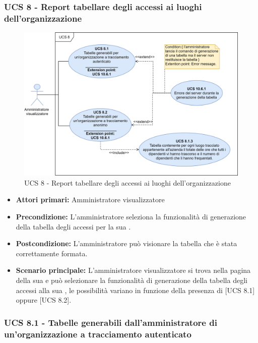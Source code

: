 \newpage
\subsubsection{UCS 8 - Report tabellare degli accessi ai luoghi dell'organizzazione}%
\begin{figure}[h!]
	\centering
    \includegraphics[scale=0.53]{Sezioni/UseCase/Immagini/UCS8.png}
    \caption{UCS 8 - Report tabellare degli accessi ai luoghi dell'organizzazione}
\end{figure}

\begin{itemize}
\item \textbf{Attori primari:} Amministratore visualizzatore
\item \textbf{Precondizione:} L'amministratore seleziona la funzionalità di generazione della tabella degli accessi per la sua .
\item \textbf{Postcondizione:} L'amministratore può visionare la tabella che è stata correttamente formata.
\item \textbf{Scenario principale:} L'amministratore visualizzatore si trova nella pagina della sua  e può selezionare la funzionalità di generazione della tabella degli accessi alla sua , le possibilità variano in funzione della presenza di  [UCS 8.1] oppure  [UCS 8.2].
\end{itemize}

\subsubsection{UCS 8.1 - Tabelle generabili dall'amministratore di un'organizzazione a tracciamento autenticato}%


